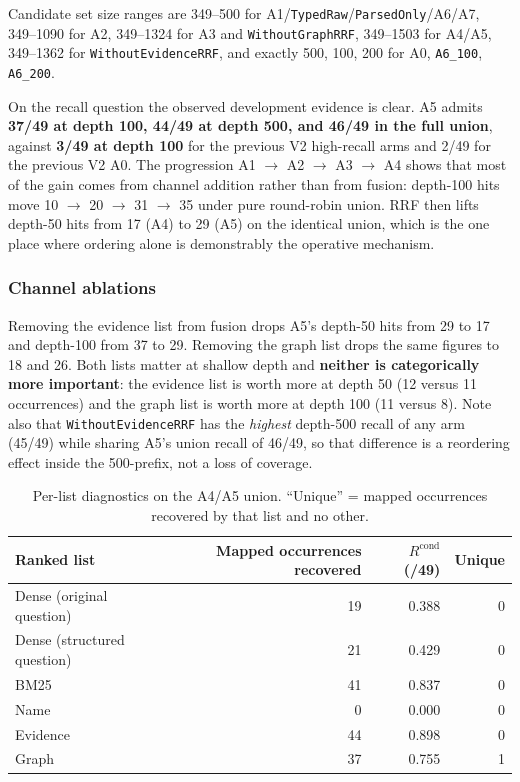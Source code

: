 \documentclass[11pt,a4paper]{article}
\begin{document}
Candidate set size ranges are 349--500 for A1/\texttt{TypedRaw}/\texttt{ParsedOnly}/A6/A7, 349--1090 for A2,
349--1324 for A3 and \texttt{WithoutGraphRRF}, 349--1503 for A4/A5, 349--1362 for
\texttt{WithoutEvidenceRRF}, and exactly 500, 100, 200 for A0, \texttt{A6\_100}, \texttt{A6\_200}.

On the recall question the observed development evidence is clear. A5 admits \textbf{37/49 at depth 100,
44/49 at depth 500, and 46/49 in the full union}, against \textbf{3/49 at depth 100} for the previous V2
high-recall arms and 2/49 for the previous V2 A0. The progression A1 $\to$ A2 $\to$ A3 $\to$ A4 shows that
most of the gain comes from channel addition rather than from fusion: depth-100 hits move 10 $\to$ 20 $\to$
31 $\to$ 35 under pure round-robin union. RRF then lifts depth-50 hits from 17 (A4) to 29 (A5) on the
identical union, which is the one place where ordering alone is demonstrably the operative mechanism.

\subsubsection*{Channel ablations}

Removing the evidence list from fusion drops A5's depth-50 hits from 29 to 17 and depth-100 from 37 to 29.
Removing the graph list drops the same figures to 18 and 26. Both lists matter at shallow depth and
\textbf{neither is categorically more important}: the evidence list is worth more at depth 50 (12 versus 11
occurrences) and the graph list is worth more at depth 100 (11 versus 8). Note also that
\texttt{WithoutEvidenceRRF} has the \emph{highest} depth-500 recall of any arm (45/49) while sharing A5's
union recall of 46/49, so that difference is a reordering effect inside the 500-prefix, not a loss of
coverage.

\begin{table}[htbp]
\centering
\small
\caption{Per-list diagnostics on the A4/A5 union. ``Unique'' = mapped occurrences recovered by that list and
no other.}
\label{tab:channel}
\begin{tabular}{lrrr}
\toprule
Ranked list & Mapped occurrences recovered & $R^{\text{cond}}$ (/49) & Unique \\
\midrule
Dense (original question)   & 19 & 0.388 & 0 \\
Dense (structured question) & 21 & 0.429 & 0 \\
BM25                        & 41 & 0.837 & 0 \\
Name                        &  0 & 0.000 & 0 \\
Evidence                    & 44 & 0.898 & 0 \\
Graph                       & 37 & 0.755 & 1 \\
\bottomrule
\end{tabular}
\end{table}
\end{document}
